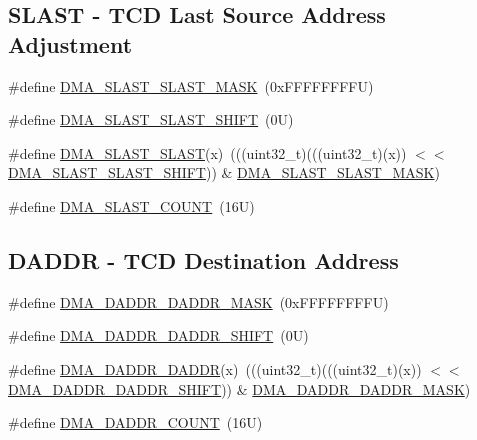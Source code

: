 \subsection*{S\+L\+A\+ST -\/ T\+CD Last Source Address Adjustment}
\begin{DoxyCompactItemize}
\item 
\#define \mbox{\hyperlink{group___d_m_a___register___masks_ga5bf83d5a89fb81000526efccd2390490}{D\+M\+A\+\_\+\+S\+L\+A\+S\+T\+\_\+\+S\+L\+A\+S\+T\+\_\+\+M\+A\+SK}}~(0x\+F\+F\+F\+F\+F\+F\+F\+F\+U)
\item 
\#define \mbox{\hyperlink{group___d_m_a___register___masks_ga3cfd6e1dd2ee3e538fe847f51c51e9e9}{D\+M\+A\+\_\+\+S\+L\+A\+S\+T\+\_\+\+S\+L\+A\+S\+T\+\_\+\+S\+H\+I\+FT}}~(0\+U)
\item 
\#define \mbox{\hyperlink{group___d_m_a___register___masks_gaaf7074ad8d4f6d4e0787cdd621f34212}{D\+M\+A\+\_\+\+S\+L\+A\+S\+T\+\_\+\+S\+L\+A\+ST}}(x)~(((uint32\+\_\+t)(((uint32\+\_\+t)(x)) $<$$<$ \mbox{\hyperlink{group___d_m_a___register___masks_ga3cfd6e1dd2ee3e538fe847f51c51e9e9}{D\+M\+A\+\_\+\+S\+L\+A\+S\+T\+\_\+\+S\+L\+A\+S\+T\+\_\+\+S\+H\+I\+FT}})) \& \mbox{\hyperlink{group___d_m_a___register___masks_ga5bf83d5a89fb81000526efccd2390490}{D\+M\+A\+\_\+\+S\+L\+A\+S\+T\+\_\+\+S\+L\+A\+S\+T\+\_\+\+M\+A\+SK}})
\item 
\#define \mbox{\hyperlink{group___d_m_a___register___masks_ga71055654243d17f5a66543bc53a8fc66}{D\+M\+A\+\_\+\+S\+L\+A\+S\+T\+\_\+\+C\+O\+U\+NT}}~(16\+U)
\end{DoxyCompactItemize}
\subsection*{D\+A\+D\+DR -\/ T\+CD Destination Address}
\begin{DoxyCompactItemize}
\item 
\#define \mbox{\hyperlink{group___d_m_a___register___masks_ga48e5c0ccc5f7c71ee28906182a7ff94c}{D\+M\+A\+\_\+\+D\+A\+D\+D\+R\+\_\+\+D\+A\+D\+D\+R\+\_\+\+M\+A\+SK}}~(0x\+F\+F\+F\+F\+F\+F\+F\+F\+U)
\item 
\#define \mbox{\hyperlink{group___d_m_a___register___masks_ga807c49b547c5b45c106ddc9f99a791c3}{D\+M\+A\+\_\+\+D\+A\+D\+D\+R\+\_\+\+D\+A\+D\+D\+R\+\_\+\+S\+H\+I\+FT}}~(0\+U)
\item 
\#define \mbox{\hyperlink{group___d_m_a___register___masks_gaa5ee85425c606207db16f18c9d16320d}{D\+M\+A\+\_\+\+D\+A\+D\+D\+R\+\_\+\+D\+A\+D\+DR}}(x)~(((uint32\+\_\+t)(((uint32\+\_\+t)(x)) $<$$<$ \mbox{\hyperlink{group___d_m_a___register___masks_ga807c49b547c5b45c106ddc9f99a791c3}{D\+M\+A\+\_\+\+D\+A\+D\+D\+R\+\_\+\+D\+A\+D\+D\+R\+\_\+\+S\+H\+I\+FT}})) \& \mbox{\hyperlink{group___d_m_a___register___masks_ga48e5c0ccc5f7c71ee28906182a7ff94c}{D\+M\+A\+\_\+\+D\+A\+D\+D\+R\+\_\+\+D\+A\+D\+D\+R\+\_\+\+M\+A\+SK}})
\item 
\#define \mbox{\hyperlink{group___d_m_a___register___masks_gaa4b6e33b6568d03f9ecec40fb2798d52}{D\+M\+A\+\_\+\+D\+A\+D\+D\+R\+\_\+\+C\+O\+U\+NT}}~(16\+U)
\end{DoxyCompactItemize}
